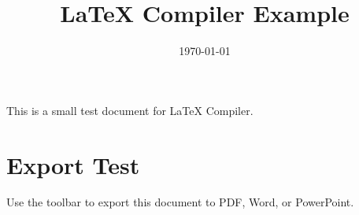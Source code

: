 \documentclass{article}
\title{LaTeX Compiler Example}
\author{}
\date{\today}
\begin{document}
\maketitle

This is a small test document for LaTeX Compiler.

\section{Export Test}

Use the toolbar to export this document to PDF, Word, or PowerPoint.
\end{document}

